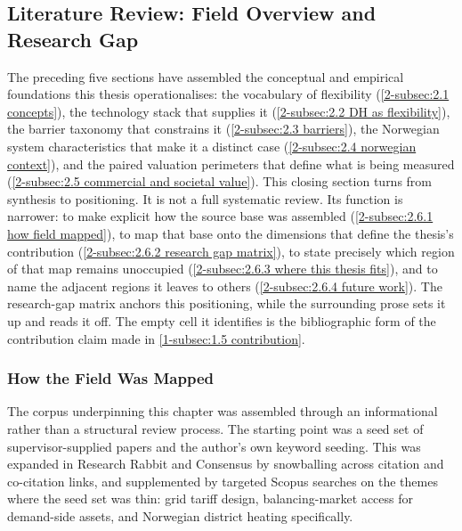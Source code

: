 \subsection{Literature Review: Field Overview and Research Gap}
\label{2-subsec:2.6 literature review}

The preceding five sections have assembled the conceptual and empirical foundations this thesis operationalises: the vocabulary of flexibility (\autoref{2-subsec:2.1 concepts}), the technology stack that supplies it (\autoref{2-subsec:2.2 DH as flexibility}), the barrier taxonomy that constrains it (\autoref{2-subsec:2.3 barriers}), the Norwegian system characteristics that make it a distinct case (\autoref{2-subsec:2.4 norwegian context}), and the paired valuation perimeters that define what is being measured (\autoref{2-subsec:2.5 commercial and societal value}). This closing section turns from synthesis to positioning. It is not a full systematic review. Its function is narrower: to make explicit how the source base was assembled (\autoref{2-subsec:2.6.1 how field mapped}), to map that base onto the dimensions that define the thesis's contribution (\autoref{2-subsec:2.6.2 research gap matrix}), to state precisely which region of that map remains unoccupied (\autoref{2-subsec:2.6.3 where this thesis fits}), and to name the adjacent regions it leaves to others (\autoref{2-subsec:2.6.4 future work}). The research-gap matrix anchors this positioning, while the surrounding prose sets it up and reads it off. The empty cell it identifies is the bibliographic form of the contribution claim made in \autoref{1-subsec:1.5 contribution}.

\subsubsection{How the Field Was Mapped}
\label{2-subsec:2.6.1 how field mapped}

The corpus underpinning this chapter was assembled through an informational rather than a structural review process. The starting point was a seed set of supervisor-supplied papers and the author's own keyword seeding. This was expanded in Research Rabbit and Consensus by snowballing across citation and co-citation links, and supplemented by targeted Scopus searches on the themes where the seed set was thin: grid tariff design, balancing-market access for demand-side assets, and Norwegian district heating specifically. 


